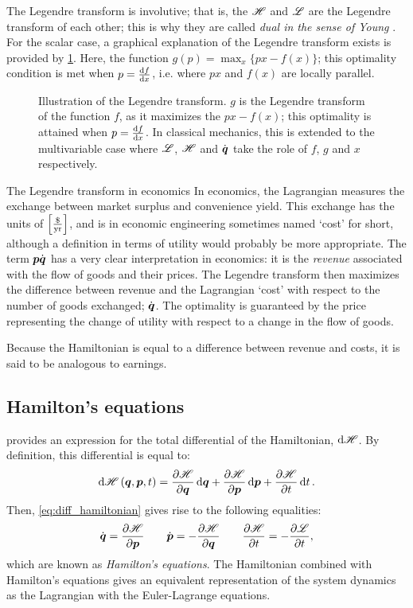 The Legendre transform is involutive; that is, the $\mathscr{H}$ and $\mathscr{L}$ are the Legendre transform of each other; this is why they are called \emph{dual in the sense of Young} \cite{Arnold1989}. For the scalar case, a graphical explanation of the Legendre transform exists is provided by \cref{fig:legendre_transform}. Here, the function $g(p) = \max_x \{px - f(x)\}$; this optimality condition is met when $p = \dv{f}{x}$, i.e. where $px$ and $f(x)$ are locally parallel.
\begin{figure}
    \centering
    
    \caption{Illustration of the Legendre transform. $g$ is the Legendre transform of the function $f$, as it maximizes the $px - f(x)$; this optimality is attained when $p = \dv{f}{x}$. In classical mechanics, this is extended to the multivariable case where $\mathscr{L}$, $\mathscr{H}$ and $\dot{\vb*{q}}$ take the role of $f$, $g$ and $x$ respectively.}
    \label{fig:legendre_transform}
\end{figure}

\begin{econ}{The Legendre transform in economics}
    In economics, the Lagrangian measures the exchange between market surplus and convenience yield. This exchange has the units of $\qty[\frac{\$}{\text{yr}}]$, and is in economic engineering sometimes named `cost' for short, although a definition in terms of utility would probably be more appropriate. The term $\vb*{p}\dot{\vb*{q}}$ has a very clear interpretation in economics: it is the \emph{revenue} associated with the flow of goods and their prices. The Legendre transform then maximizes the difference between revenue and the Lagrangian `cost' with respect to the number of goods exchanged; $\dot{\vb*{q}}$. The optimality is guaranteed by the price representing the change of utility with respect to a change in the flow of goods.

    Because the Hamiltonian is equal to a difference between revenue and costs, it is said to be analogous to earnings.
\end{econ}

\subsection{Hamilton's equations}
\label{sec:hamilton_eqs}
 provides an expression for the total differential of the Hamiltonian, $\dd{\ensuremath{\mathscr{H}}}$. By definition, this differential is equal to:
$$ \dd{\ensuremath{\mathscr{H}}}(\vb*{q}, \vb*{p}, t) = \pdv{\ensuremath{\mathscr{H}}}{\ensuremath{\vb*{q}}}\dd{\ensuremath{\vb*{q}}} + \pdv{\ensuremath{\mathscr{H}}}{\ensuremath{\vb*{p}}}\dd{\ensuremath{\vb*{p}}} + \pdv{\ensuremath{\mathscr{H}}}{t}\dd{t}. $$
Then, \cref{eq:diff_hamiltonian} gives rise to the following equalities:
\begin{equation}
    \dot{\vb*{q}} = \pdv{\ensuremath{\mathscr{H}}}{\ensuremath{\vb*{p}}} \qquad \dot{\vb*{p}} = -\pdv{\ensuremath{\mathscr{H}}}{\ensuremath{\vb*{q}}} \qquad \pdv{\ensuremath{\mathscr{H}}}{t} = - \pdv{\ensuremath{\mathscr{L}}}{t},
    \label{eq:ham_eqs}
\end{equation}
which are known as \emph{Hamilton's equations}. The Hamiltonian combined with Hamilton's equations gives an equivalent representation of the system dynamics as the Lagrangian with the Euler-Lagrange equations.

